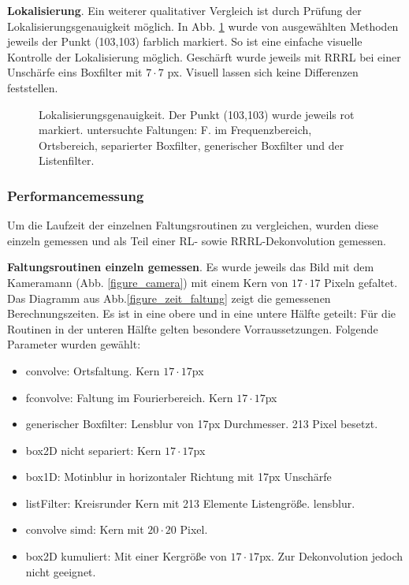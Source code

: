 \documentclass[a4paper,12pt]{article}
\begin{document}
\textbf{Lokalisierung}. Ein weiterer qualitativer Vergleich ist durch Prüfung
der Lokalisierungsgenauigkeit möglich. In Abb. \ref{figure_lokalisierung} wurde
von ausgewählten Methoden jeweils der Punkt (103,103) farblich markiert. 
So ist eine einfache visuelle
Kontrolle der Lokalisierung möglich. Geschärft wurde jeweils mit RRRL bei einer
Unschärfe eins Boxfilter mit $7 \cdot 7$ px. Visuell lassen sich keine
Differenzen feststellen.

\begin{figure}[htbp]
\caption{Lokalisierungsgenauigkeit. Der Punkt (103,103) wurde jeweils rot
markiert. untersuchte Faltungen: F. im Frequenzbereich, Ortsbereich,
separierter Boxfilter, generischer Boxfilter und der Listenfilter.}%
\label{figure_lokalisierung}
\end{figure}

\subsubsection{Performancemessung}
Um die Laufzeit der einzelnen Faltungsroutinen zu vergleichen, wurden diese
einzeln gemessen und als Teil einer RL- sowie RRRL-Dekonvolution gemessen.

\textbf{Faltungsroutinen einzeln gemessen}. Es wurde jeweils das Bild mit dem
Kameramann (Abb. \ref{figure_camera}) mit einem Kern von $17 \cdot 17$ Pixeln
gefaltet. Das Diagramm aus Abb.\ref{figure_zeit_faltung} zeigt die gemessenen
Berechnungszeiten. Es ist in eine obere und in eine untere Hälfte geteilt: 
Für die Routinen in der unteren Hälfte gelten besondere Vorraussetzungen.
Folgende Parameter wurden gewählt:
\begin{itemize}
  \itemsep -1pt
  \item convolve: Ortsfaltung. Kern $17 \cdot 17$px
  \item fconvolve: Faltung im Fourierbereich. Kern $17 \cdot 17$px
  \item generischer Boxfilter: Lensblur von 17px Durchmesser.
  213 Pixel besetzt.
  \item box2D nicht separiert: Kern $17 \cdot 17$px
  \item box1D: Motinblur in horizontaler Richtung mit 17px Unschärfe
  \item listFilter: Kreisrunder Kern mit 213 Elemente Listengröße. lensblur.
  \item convolve simd: Kern mit $20 \cdot 20$ Pixel.
  \item box2D kumuliert: Mit einer Kergröße von $17 \cdot 17$px. Zur
  Dekonvolution jedoch nicht geeignet.
\end{itemize}
\end{document}
